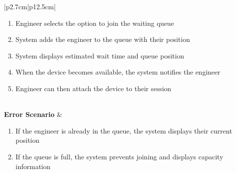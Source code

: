\begin{table}[H]
\begin{tabular}{|p{2.7cm}|p{12.5cm}|}
\begin{minipage}[t]{\linewidth}
\begin{enumerate}[topsep=0pt,itemsep=1pt,parsep=0pt,partopsep=0pt]
                                              \item Engineer selects the option to join the waiting queue
                                              \item System adds the engineer to the queue with their position
                                              \item System displays estimated wait time and queue position
                                              \item When the device becomes available, the system notifies the engineer
                                              \item Engineer can then attach the device to their session
                                          \end{enumerate}
                                      \end{minipage}                 \\
            \hline
            \textbf{Error Scenario} & \begin{minipage}[t]{\linewidth}
                                          \begin{enumerate}[topsep=0pt,itemsep=1pt,parsep=0pt,partopsep=0pt]
                                              \item If the engineer is already in the queue, the system displays their current
                                                    position
                                              \item If the queue is full, the system prevents joining and displays capacity
                                                    information
                                          \end{enumerate}
                                      \end{minipage}          \\
            \hline
        \end{tabular}
        \label{tab:eng-join-queue}
    \end{table}
